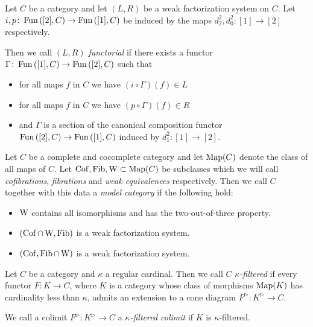\begin{definition}
    Let $C$ be a category and let $(L,R)$ be a weak factorization system on $C$.
    Let $i,p\colon\operatorname{Fun}\left([2],C\right)\to\operatorname{Fun}\left([1],C\right)$ be induced by the maps $d_2^2,d_0^2\colon [1]\to[2]$ respectively.

    Then we call $(L,R)$ \emph{functorial} if there exists a functor $\Gamma\colon\operatorname{Fun}\left([1],C\right)\to\operatorname{Fun}\left([2],C\right)$ such that
    \begin{itemize}
        \item for all maps $f$ in $C$ we have $(i\circ\Gamma)(f)\in L$
        \item for all maps $f$ in $C$ we have $(p\circ\Gamma)(f)\in R$
        \item and $\Gamma$ is a section of the canonical composition functor $\operatorname{Fun}\left([2],C\right)\to\operatorname{Fun}\left([1],C\right)$ induced by $d_1^2\colon [1]\to[2]$. 
    \end{itemize}
\end{definition}
\begin{definition}
    Let $C$ be a complete and cocomplete category and let $\operatorname{Map}(C)$ denote the class of all maps of $C$.
    Let $\operatorname{Cof},\operatorname{Fib},\operatorname{W}\subset\operatorname{Map}(C)$ be subclasses which we will call \emph{cofibrations}, \emph{fibrations} and \emph{weak equivalences} respectively.
    Then we call $C$ together with this data a \emph{model category} if the following hold:
    \begin{itemize}
        \item $\operatorname{W}$ contains all isomorphisms and has the two-out-of-three property.
        \item $(\operatorname{Cof}\cap\operatorname{W},\operatorname{Fib})$ is a weak factorization system.
        \item $(\operatorname{Cof},\operatorname{Fib}\cap\operatorname{W})$ is a weak factorization system.
    \end{itemize}
\end{definition}
\begin{definition}
    Let $C$ be a category and $\kappa$ a regular cardinal.
    Then we call $C$ \emph{$\kappa$-filtered} if every functor $F\colon K\to C$, where $K$ is a category whose class of morphisms $\operatorname{Map}(K)$ has cardinality less than $\kappa$, admits an extension to a cone diagram $F^{\rhd}\colon K^{\rhd}\to C$.

    We call a colimit $F^{\rhd}\colon K^{\rhd}\to C$ a \emph{$\kappa$-filtered colimit} if $K$ is $\kappa$-filtered.
\end{definition}
